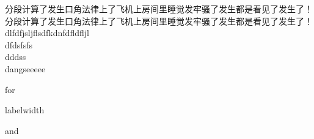 \documentclass[no-math]{course}
\begin{document}
\begin{paracol}{2}
	\begin{analysis}
			分段计算了发生口角法律上了飞机上房间里睡觉发牢骚了发生都是看见了发生了！
			分段计算了发生口角法律上了飞机上房间里睡觉发牢骚了发生都是看见了发生了！\\
	dlfdfjsljflsdfkdnfdfldfljl \\
	dfdsfsfs \\
	dddss\\
	dangseeeee
	\end{analysis}

\end{paracol}

	\begin{Exercise}
	\begin{exercises}
		\item for
		\item labelwidth
		\item and
	\end{exercises}
\end{Exercise}
\end{document}
